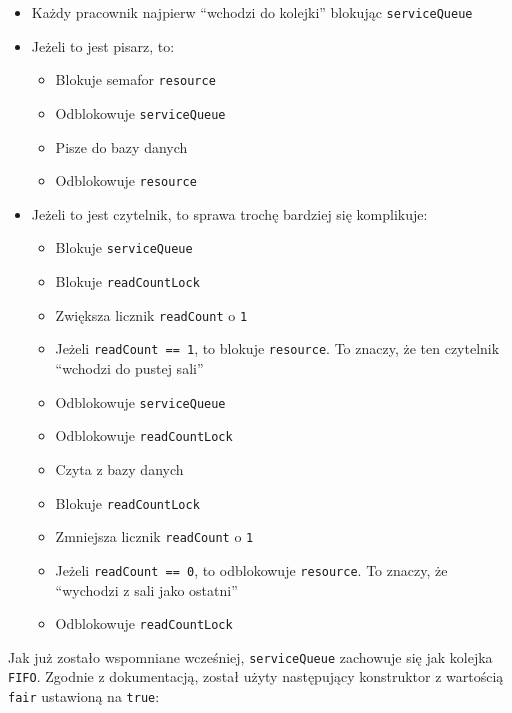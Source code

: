 \documentclass[11pt]{article}
\providecommand{\tightlist}{%
      \setlength{\itemsep}{0pt}\setlength{\parskip}{0pt}}
\begin{document}
\begin{itemize}
\tightlist
\item
  Każdy pracownik najpierw ``wchodzi do kolejki'' blokując
  \texttt{serviceQueue}
\item
  Jeżeli to jest pisarz, to:

  \begin{itemize}
  \tightlist
  \item
    Blokuje semafor \texttt{resource}
  \item
    Odblokowuje \texttt{serviceQueue}
  \item
    Pisze do bazy danych
  \item
    Odblokowuje \texttt{resource}
  \end{itemize}
\item
  Jeżeli to jest czytelnik, to sprawa trochę bardziej się komplikuje:

  \begin{itemize}
  \tightlist
  \item
    Blokuje \texttt{serviceQueue}
  \item
    Blokuje \texttt{readCountLock}
  \item
    Zwiększa licznik \texttt{readCount} o \texttt{1}
  \item
    Jeżeli \texttt{readCount\ ==\ 1}, to blokuje \texttt{resource}. To
    znaczy, że ten czytelnik ``wchodzi do pustej sali''
  \item
    Odblokowuje \texttt{serviceQueue}
  \item
    Odblokowuje \texttt{readCountLock}
  \item
    Czyta z bazy danych
  \item
    Blokuje \texttt{readCountLock}
  \item
    Zmniejsza licznik \texttt{readCount} o \texttt{1}
  \item
    Jeżeli \texttt{readCount\ ==\ 0}, to odblokowuje \texttt{resource}.
    To znaczy, że ``wychodzi z sali jako ostatni''
  \item
    Odblokowuje \texttt{readCountLock}
  \end{itemize}
\end{itemize}

Jak już zostało wspomniane wcześniej, \texttt{serviceQueue} zachowuje
się jak kolejka \texttt{FIFO}. Zgodnie z dokumentacją, został użyty
następujący konstruktor z wartością \texttt{fair} ustawioną na
\texttt{true}:
\end{document}
